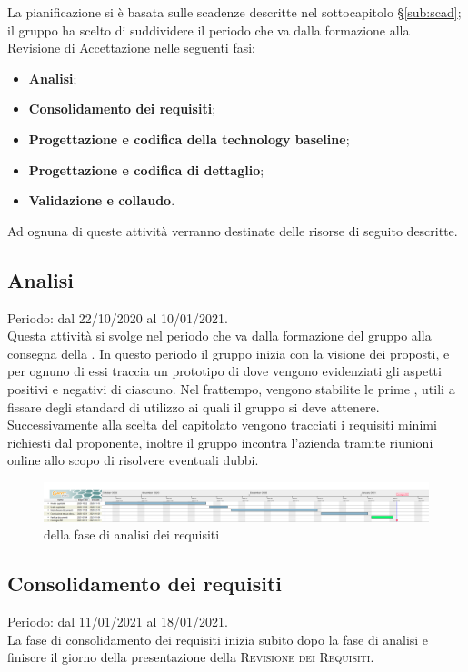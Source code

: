 \documentclass[../piano_di_progetto.tex]{subfiles}
\begin{document}
La pianificazione si è basata sulle scadenze descritte nel sottocapitolo \S\ref{sub:scad}; il gruppo ha scelto di suddividere il periodo che va dalla formazione alla Revisione di Accettazione nelle seguenti fasi:
\begin{itemize}
\item \textbf{Analisi};
\item \textbf{Consolidamento dei requisiti};
\item \textbf{Progettazione e codifica della technology baseline};
\item \textbf{Progettazione e codifica di dettaglio};
\item \textbf{Validazione e collaudo}.
\end{itemize}
Ad ognuna di queste attività verranno destinate delle risorse di seguito descritte.

\subsection{Analisi}%
\label{sub:analisi}
Periodo: dal 22/10/2020 al 10/01/2021.\\
Questa attività si svolge nel periodo che va dalla formazione del gruppo alla consegna della . In questo periodo il gruppo inizia con la visione dei  proposti, e per ognuno di essi traccia un prototipo di \textsc{} dove vengono evidenziati gli aspetti positivi e negativi di ciascuno. Nel frattempo, vengono stabilite le prime , utili a fissare degli standard di utilizzo ai quali il gruppo si deve attenere. Successivamente alla scelta del capitolato vengono tracciati i requisiti minimi richiesti dal proponente, inoltre il gruppo incontra l’azienda tramite riunioni online allo scopo di risolvere eventuali dubbi.\\

\begin{figure}[H]
\centering
\includegraphics[width=18cm]{src/img/gantt/01_RR.png}
\caption{  della fase di analisi dei requisiti}

\end{figure}


\subsection{Consolidamento dei requisiti}%
\label{sub:cons_req}
Periodo: dal 11/01/2021 al 18/01/2021.\\
La fase di consolidamento dei requisiti inizia subito dopo la fase di analisi e finiscre il giorno della presentazione della \textsc{Revisione dei Requisiti}.
\end{document}
